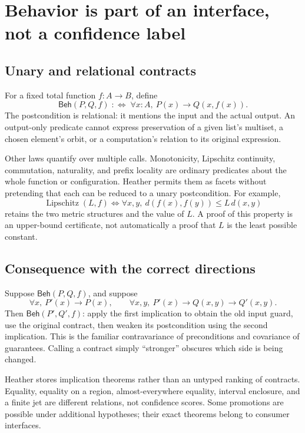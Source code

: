 \documentclass[11pt,letterpaper]{article}
\newcommand{\Beh}{\mathsf{Beh}}\newcommand{\Req}{\mathsf{Req}}
\theoremstyle{definition}\newtheorem{definition}[theorem]{Definition}
\theoremstyle{remark}\newtheorem{remark}[theorem]{Remark}
\begin{document}
\section{Behavior is part of an interface, not a confidence label}\label{sec:behavior}

\subsection{Unary and relational contracts}
For a fixed total function $f:A\to B$, define
\[
 \Beh(P,Q,f)\;:\!\!\iff\;\forall x:A,\ P(x)\to Q(x,f(x)).
\]
The postcondition is relational: it mentions the input and the actual output.
An output-only predicate cannot express preservation of a given list's
multiset, a chosen element's orbit, or a computation's relation to its original
expression.

Other laws quantify over multiple calls. Monotonicity, Lipschitz continuity,
commutation, naturality, and prefix locality are ordinary predicates about the
whole function or configuration. Heather permits them as facets without
pretending that each can be reduced to a unary postcondition. For example,
\[
 \operatorname{Lipschitz}(L,f)\iff
 \forall x,y,\ d(f(x),f(y))\le L\,d(x,y)
\]
retains the two metric structures and the value of $L$. A proof of this
property is an upper-bound certificate, not automatically a proof that $L$ is
the least possible constant.

\subsection{Consequence with the correct directions}
Suppose $\Beh(P,Q,f)$, and suppose
\[
 \forall x,\ P'(x)\to P(x),\qquad
 \forall x,y,\ P'(x)\to Q(x,y)\to Q'(x,y).
\]
Then $\Beh(P',Q',f)$: apply the first implication to obtain the old input guard,
use the original contract, then weaken its postcondition using the second
implication. This is the familiar contravariance of preconditions and covariance
of guarantees. Calling a contract simply ``stronger'' obscures which side is
being changed.

Heather stores implication theorems rather than an untyped ranking of contracts.
Equality, equality on a region, almost-everywhere equality, interval enclosure,
and a finite jet are different relations, not confidence scores. Some
promotions are possible under additional hypotheses; their exact theorems
belong to consumer interfaces.
\end{document}
